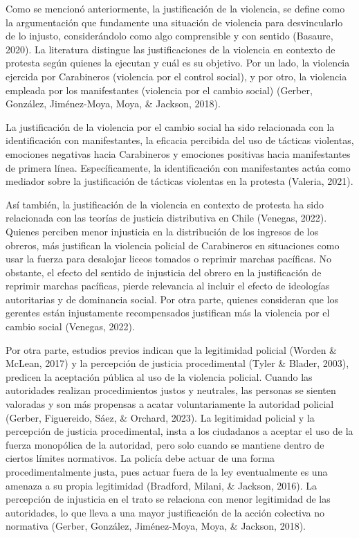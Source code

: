\documentclass[12pt,twoside]{templates/facsothesis}
\begin{document}
Como se mencionó anteriormente, la justificación de la violencia, se define como la argumentación que fundamente una situación de violencia para desvincularlo de lo injusto, considerándolo como algo comprensible y con sentido (Basaure, 2020). La literatura distingue las justificaciones de la violencia en contexto de protesta según quienes la ejecutan y cuál es su objetivo. Por un lado, la violencia ejercida por Carabineros (violencia por el control social), y por otro, la violencia empleada por los manifestantes (violencia por el cambio social) (Gerber, González, Jiménez-Moya, Moya, \& Jackson, 2018).

La justificación de la violencia por el cambio social ha sido relacionada con la identificación con manifestantes, la eficacia percibida del uso de tácticas violentas, emociones negativas hacia Carabineros y emociones positivas hacia manifestantes de primera línea. Específicamente, la identificación con manifestantes actúa como mediador sobre la justificación de tácticas violentas en la protesta (Valeria, 2021).

Así también, la justificación de la violencia en contexto de protesta ha sido relacionada con las teorías de justicia distributiva en Chile (Venegas, 2022). Quienes perciben menor injusticia en la distribución de los ingresos de los obreros, más justifican la violencia policial de Carabineros en situaciones como usar la fuerza para desalojar liceos tomados o reprimir marchas pacíficas. No obstante, el efecto del sentido de injusticia del obrero en la justificación de reprimir marchas pacíficas, pierde relevancia al incluir el efecto de ideologías autoritarias y de dominancia social. Por otra parte, quienes consideran que los gerentes están injustamente recompensados justifican más la violencia por el cambio social (Venegas, 2022).

Por otra parte, estudios previos indican que la legitimidad policial (Worden \& McLean, 2017) y la percepción de justicia procedimental (Tyler \& Blader, 2003), predicen la aceptación pública al uso de la violencia policial. Cuando las autoridades realizan procedimientos justos y neutrales, las personas se sienten valoradas y son más propensas a acatar voluntariamente la autoridad policial (Gerber, Figuereido, Sáez, \& Orchard, 2023). La legitimidad policial y la percepción de justicia procedimental, insta a los ciudadanos a aceptar el uso de la fuerza monopólica de la autoridad, pero solo cuando se mantiene dentro de ciertos límites normativos. La policía debe actuar de una forma procedimentalmente justa, pues actuar fuera de la ley eventualmente es una amenaza a su propia legitimidad (Bradford, Milani, \& Jackson, 2016). La percepción de injusticia en el trato se relaciona con menor legitimidad de las autoridades, lo que lleva a una mayor justificación de la acción colectiva no normativa (Gerber, González, Jiménez-Moya, Moya, \& Jackson, 2018).
\end{document}
